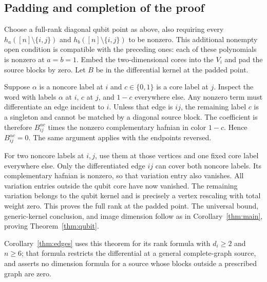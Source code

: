 \documentclass[11pt]{article}
\theoremstyle{remark}\newtheorem{remark}[theorem]{Remark}
\begin{document}
\subsection{Padding and completion of the proof}
Choose a full-rank diagonal qubit point as above, also requiring every
$h_a([n]\setminus\{i,j\})$ and $h_b([n]\setminus\{i,j\})$ to be
nonzero. This additional nonempty open condition is compatible with
the preceding ones: each of these polynomials is nonzero at $a=b=1$.
Embed the two-dimensional cores into the $V_i$ and pad the source
blocks by zero. Let $B$ be in the differential kernel at the padded point.

Suppose $\alpha$ is a noncore label at $i$ and $c\in\{0,1\}$ is a
core label at $j$. Inspect the word with labels $\alpha$ at $i$, $c$ at
$j$, and $1-c$ everywhere else. Any nonzero term must differentiate
an edge incident to $i$. Unless that edge is $ij$, the remaining label
$c$ is a singleton and cannot be matched by a diagonal source block.
The coefficient is therefore $B_{ij}^{\alpha c}$ times the nonzero
complementary hafnian in color $1-c$. Hence $B_{ij}^{\alpha c}=0$.
The same argument applies with the endpoints reversed.

For two noncore labels at $i,j$, use them at those vertices and one
fixed core label everywhere else. Only the differentiated edge $ij$
can cover both noncore labels. Its complementary hafnian is nonzero,
so that variation entry also vanishes. All variation entries outside
the qubit core have now vanished. The remaining variation belongs to
the qubit kernel and is precisely a vertex rescaling with total weight
zero. This proves the full rank at the padded point. The universal
bound, generic-kernel conclusion, and image dimension follow as in
Corollary~\ref{thm:main}, proving Theorem~\ref{thm:qubit}.

Corollary~\ref{thm:edges} uses this theorem for its rank formula with
$d_i\geq2$ and $n\geq6$; that formula restricts the differential at a
general complete-graph source, and asserts no dimension formula for a
source whose blocks outside a prescribed graph are zero.
\end{document}
